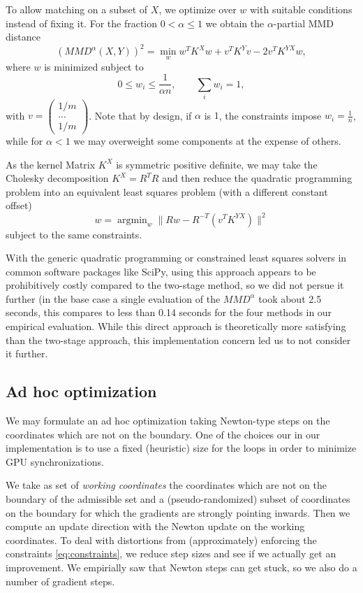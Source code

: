 \documentclass[a4paper,twoside,10pt]{article}
\DeclareMathOperator*{\argmin}{argmin}
\theoremstyle{plain}
\theoremstyle{remark}
\begin{document}
To allow matching on a subset of $X$, we optimize over $w$ with suitable conditions instead of fixing it. For the fraction $0 < \alpha \leq 1$  we obtain the $\alpha$-partial MMD distance
\begin{equation}
\label{eq:qp}
(MMD^{\alpha}(X, Y))^2 = \min_w  w^T K^X w + v^T K^{Y} v
        -  2 v^T K^{YX} w,
\end{equation}
where $w$ is minimized subject to
\begin{equation}
\label{eq:constraints}
 0 \leq w_i \leq \frac{1}{\alpha n}, \qquad \sum_i w_i = 1,
\end{equation}
with $v = \left(\begin{smallmatrix}1/m\\...\\1/m\end{smallmatrix}\right)$.
Note that by design, if $\alpha$ is $1$, the constraints impose $w_i = \frac{1}{n}$, while for $\alpha < 1$ we may overweight some components at the expense of others.

As the kernel Matrix $K^X$ is symmetric positive definite,
we may take the Cholesky decomposition $K^X = R^T R$ and then reduce the quadratic programming problem into an equivalent least squares problem (with a different constant offset)
\[
w = \argmin_w \| R w - R^{-T} (v^TK^{YX})   \|^2 
\]
subject to the same constraints.

With the generic quadratic programming or constrained least squares solvers in common software packages like SciPy, using this approach appears to be prohibitively costly compared to the two-stage method, so we did not persue it further (in the base case a single evaluation of the $MMD^\alpha$ took about 2.5 seconds, this compares to less than 0.14 seconds for the four methods in our empirical evaluation. While this direct approach is theoretically more satisfying than the two-stage approach, this implementation concern led us to not consider it further.

\subsection{Ad hoc optimization}

We may formulate an ad hoc optimization taking Newton-type steps on the coordinates which are not on the boundary. One of the choices our in our implementation is to use a fixed (heuristic) size for the loops in order to minimize
GPU synchronizations.

We take as set of \textit{working coordinates} the coordinates which are not on the boundary of the admissible set and a (pseudo-randomized) subset of coordinates on the boundary for which the gradients are strongly pointing inwards.
Then we compute an update direction with the Newton update on the working coordinates.
To deal with distortions from (approximately) enforcing the constraints \eqref{eq:constraints}, we reduce step sizes and see if we actually get an improvement.
We empirially saw that Newton steps can get stuck, so we also do a number of gradient steps.
\end{document}
